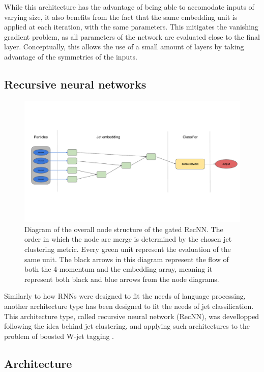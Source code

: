 While this architecture has the advantage of being able to accomodate inputs of varying size, it also benefits from the fact that the same embedding unit is applied at each iteration, with the same parameters. This mitigates the vanishing gradient problem, as all parameters of the network are evaluated close to the final layer. Conceptually, this allows the use of a small amount of layers by taking advantage of the symmetries of the inputs. 

\subsection{Recursive neural networks}
\label{sec:RecNN}


\begin{figure}
    \centering
    \includegraphics[width=\textwidth]{Images/RecNN_diagram_not_parall.pdf}
    \caption{Diagram of the overall node structure of the gated RecNN. The order in which the node are merge is determined by the chosen jet clustering metric. Every green unit represent the evaluation of the same unit. The black arrows in this diagram represent the flow of both the 4-momentum and the embedding array, meaning it represent both black and blue arrows from the node diagrams.}
    \label{fig:recursive_network}
\end{figure}

Similarly to how RNNs were designed to fit the needs of language processing, another architecture type has been designed to fit the needs of jet classification. This architecture type, called recursive neural network (RecNN), was devellopped following the idea behind jet clustering, and applying such architectures to the problem of boosted W-jet tagging \cite{Louppe:2017ipp}.

\subsection{Architecture}

